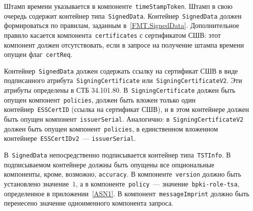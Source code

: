 Штамп времени указывается в компоненте~\texttt{timeStampToken}. 
Штамп в свою очередь содержит контейнер типа~\texttt{SignedData}.
%
Контейнер~\texttt{SignedData} должен формироваться по правилам,
заданным в~\ref{FMT.SignedData}. Дополнительное правило  
касается компонента~\texttt{certificates} с сертификатом СШВ:
этот компонент должен отсутствовать, если в запросе на получение штампа 
времени опущен флаг~\texttt{certReq}.

Контейнер~\texttt{SignedData} должен содержать ссылку на сертификат СШВ
в виде подписанного атрибута~\texttt{SigningCertificate} 
или~\texttt{SigningCertificateV2}. Эти атрибуты определены в СТБ 
34.101.80.  
%
В~\texttt{SigningCertificate} должен быть опущен 
компонент~\texttt{policies}, должен быть вложен только один 
контейнер~\texttt{ESSCertID} (ссылка на сертификат СШВ), 
и в этом контейнере должен быть опущен компонент~\texttt{issuerSerial}.
%
Аналогично: в~\texttt{SigningCertificateV2} должен быть опущен 
компонент~\texttt{policies}, в единственном вложенном 
контейнере~\texttt{ESSCertIDv2}~--- \texttt{issuerSerial}.

В~\texttt{SignedData} непосредственно подписывается 
контейнер типа~\texttt{TSTInfo}. 
%
В подписываемом контейнере должны быть опущены все опциональные компоненты, 
кроме, возможно, \texttt{accuracy}. 
%
В компоненте~\texttt{version} должно быть установлено значение~$1$,
а в компоненте~\texttt{policy}~--- значение~\texttt{bpki-role-tsa},
определенное в приложении~\ref{ASN1}.
%
В компонент~\texttt{messageImprint} должно быть перенесено
значение одноименного компонента запроса.

